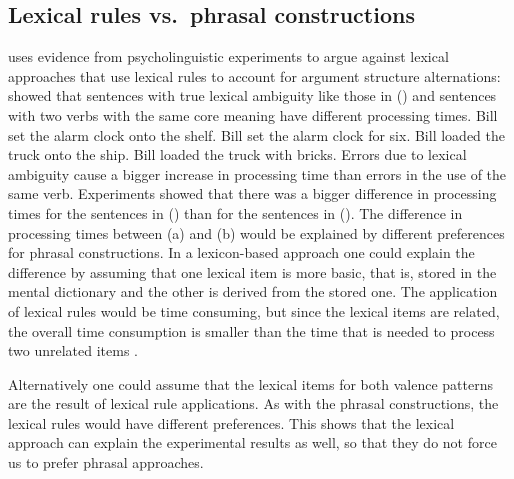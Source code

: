 \begin{exe}
\begin{xlist}[iv.]
\begin{exe}
\begin{xlist}[iv.]
\subsection{Lexical rules vs.\ phrasal constructions}
\label{sec-lr-phrasal-psycho}

\mbox{}\citet[Section~1.4.5]{Goldberg95a} uses evidence from psycholinguistic experiments to argue against lexical
approaches that use lexical rules to account for argument structure alternations: \citet{CT88a}
showed that sentences with true lexical ambiguity like those in () and sentences with two
verbs with the same core meaning have different processing times.
\eal
\ex Bill set the alarm clock onto the shelf.
\ex Bill set the alarm clock for six.
\zl
\eal
\ex Bill loaded the truck onto the ship.
\ex Bill loaded the truck with bricks.
\zl
Errors due to lexical ambiguity cause a bigger increase in processing time than errors in the use of
the same verb. Experiments showed that there was a bigger difference in processing times for the
sentences in () than for the sentences in (). The difference in processing times
between (a) and (b) would be explained by different preferences for phrasal
constructions. In a lexicon-based approach one could explain the difference by assuming that one
lexical item is more basic, that is, stored in the mental dictionary and the other is derived from
the stored one. The application of lexical rules would be time consuming, but since the lexical
items are related, the overall time consumption is smaller than the time that is needed to process
two unrelated items \citep[]{Mueller2002b}.

Alternatively one could assume that the lexical items for both valence patterns are the result of
lexical rule applications. As with the phrasal constructions, the lexical rules would have different
preferences. This shows that the lexical approach can explain the experimental results as well, so
that they do not force us to prefer phrasal approaches.


\end{xlist}
\end{exe}
\end{xlist}
\end{exe}
